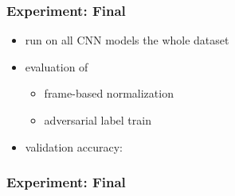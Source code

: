 \begin{frame}
  \frametitle{Experiment: Final}
  \begin{itemize}
    \item run on all CNN models the whole dataset
    \item evaluation of
    \begin{itemize}
     \item frame-based normalization
     \item adversarial label train
    \end{itemize}
    \item validation accuracy:
    \vspace{-0.5cm}
  \begin{figure}[!ht]
    \centering
  \end{figure}
  \end{itemize}
\end{frame}

\begin{frame}
  \frametitle{Experiment: Final}
  \centering \vfill
  
\end{frame}

